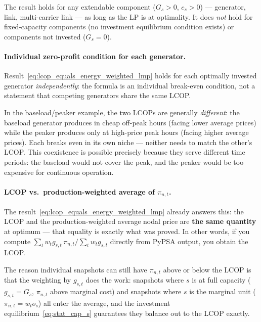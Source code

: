 \documentclass{article}
\begin{document}
\begin{tcolorbox}[colback=blue!5, colframe=blue!40!black, title={Scope of the result}]
The result holds for any extendable component ($G_s > 0$, $c_s > 0$) --- generator, link,
multi-carrier link --- as long as the LP is at optimality.  It does \emph{not} hold for
fixed-capacity components (no investment equilibrium condition exists) or components not
invested ($G_s = 0$).
\end{tcolorbox}

\paragraph{Individual zero-profit condition for each generator.}
Result~\eqref{eq:lcop_equals_energy_weighted_lmp} holds for each optimally
invested generator \emph{independently}: the formula is an individual
break-even condition, not a statement that competing generators share the
same LCOP.

In the baseload/peaker example, the two LCOPs are generally \emph{different}:
the baseload generator produces in cheap off-peak hours (facing lower average
prices) while the peaker produces only at high-price peak hours (facing higher
average prices). Each breaks even in its own niche --- neither needs to match
the other's LCOP. This coexistence is possible precisely because they serve
different time periods: the baseload would not cover the peak, and the peaker
would be too expensive for continuous operation.

\paragraph{LCOP vs.\ production-weighted average of $\pi_{n,t}$.}
The result~\eqref{eq:lcop_equals_energy_weighted_lmp} already answers this:
the LCOP and the production-weighted average nodal price are \textbf{the same
quantity} at optimum --- that equality is exactly what was proved.
In other words, if you compute $\sum_t w_t g_{s,t}\,\pi_{n,t} \big/
\sum_t w_t g_{s,t}$ directly from PyPSA output, you obtain the LCOP.

The reason individual snapshots can still have $\pi_{n,t}$ above or below
the LCOP is that the weighting by $g_{s,t}$ does the work: snapshots where
$s$ is at full capacity ($g_{s,t} = G_s$, $\pi_{n,t}$ above marginal cost)
and snapshots where $s$ is the marginal unit ($\pi_{n,t} = w_t o_s$) all
enter the average, and the investment equilibrium~\eqref{eq:stat_cap_s}
guarantees they balance out to the LCOP exactly.
\end{document}
